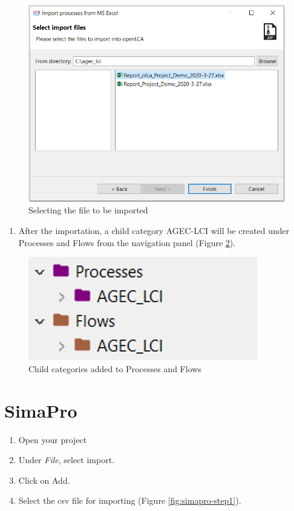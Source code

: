 \documentclass[openany]{book}
\providecommand{\tightlist}{%
  \setlength{\itemsep}{0pt}\setlength{\parskip}{0pt}}
\begin{document}
\begin{figure}[ht]

{\centering \includegraphics[width=0.7\linewidth]{Figures/olca_step2} 

}

\caption{Selecting the file to be imported}\label{fig:olca-step2}
\end{figure}

\begin{enumerate}
\def\labelenumi{\arabic{enumi}.}
\setcounter{enumi}{5}
\tightlist
\item
  After the importation, a child category AGEC-LCI will be created under Processes and Flows from the navigation panel (Figure \ref{fig:olca-step3}).
\end{enumerate}

\begin{figure}[ht]

{\centering \includegraphics[width=0.4\linewidth]{Figures/olca_step3} 

}

\caption{Child categories added to Processes and Flows}\label{fig:olca-step3}
\end{figure}

\hypertarget{import-simapro}{%
\section{SimaPro}\label{import-simapro}}

\begin{enumerate}
\def\labelenumi{\arabic{enumi}.}
\item
  Open your project
\item
  Under \emph{File}, select import.
\item
  Click on Add.
\item
  Select the csv file for importing (Figure \ref{fig:simapro-step1}).
\end{enumerate}
\end{document}
